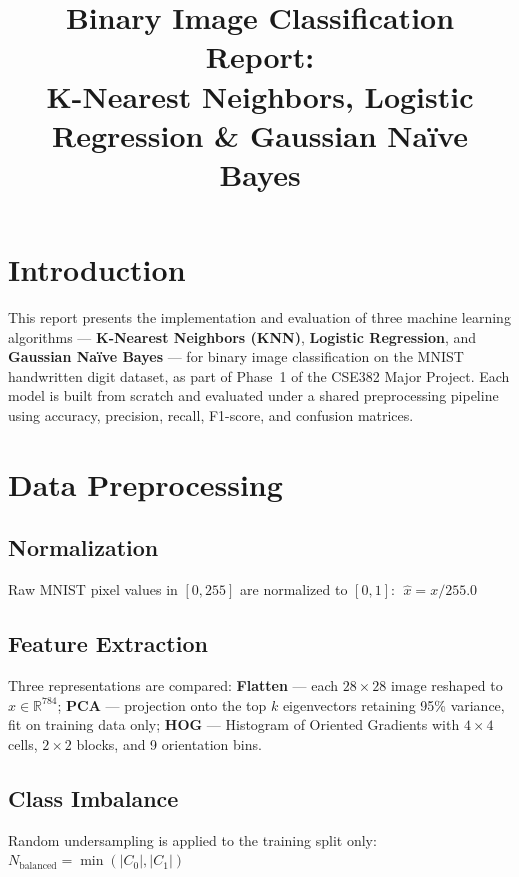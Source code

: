 \documentclass[11pt,a4paper]{article}
\title{\vspace{-1cm}Binary Image Classification Report:\\
K-Nearest Neighbors, Logistic Regression \& Gaussian Na\"{i}ve Bayes}
\author{}
\date{}
\begin{document}
\maketitle
\vspace{-0.8cm}
\tableofcontents
\newpage

\section{Introduction}

This report presents the implementation and evaluation of three machine learning algorithms --- \textbf{K-Nearest Neighbors (KNN)}, \textbf{Logistic Regression}, and \textbf{Gaussian Na\"{i}ve Bayes} --- for binary image classification on the MNIST handwritten digit dataset, as part of Phase~1 of the CSE382 Major Project. Each model is built from scratch and evaluated under a shared preprocessing pipeline using accuracy, precision, recall, F1-score, and confusion matrices.

\section{Data Preprocessing}

\subsection{Normalization}
Raw MNIST pixel values in $[0,255]$ are normalized to $[0,1]$: $\;\hat{x} = x / 255.0$

\subsection{Feature Extraction}
Three representations are compared: \textbf{Flatten} — each $28\times28$ image reshaped to $x \in \mathbb{R}^{784}$; \textbf{PCA} — projection onto the top $k$ eigenvectors retaining 95\% variance, fit on training data only; \textbf{HOG} — Histogram of Oriented Gradients with $4\times4$ cells, $2\times2$ blocks, and 9 orientation bins.

\subsection{Class Imbalance}
Random undersampling is applied to the training split only: $N_{\text{balanced}} = \min(|C_0|, |C_1|)$
\end{document}
